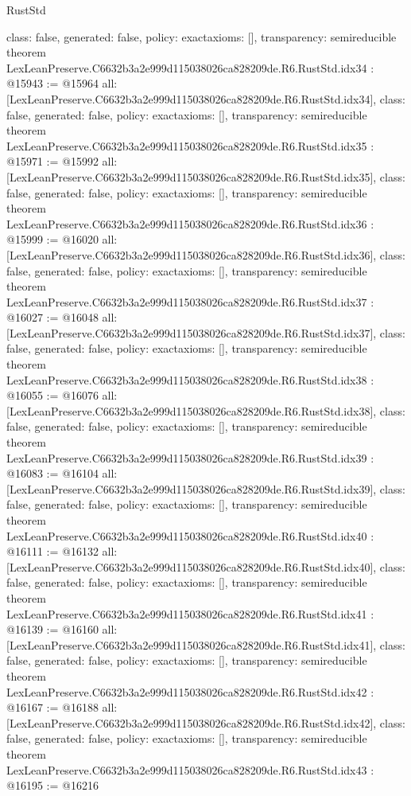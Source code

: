 \begin{lexlean}{RustStd}
\begin{coremodule}
{  class: false,
  generated: false,
  policy: exact{axioms: []},
  transparency: semireducible
}
theorem LexLeanPreserve.C6632b3a2e999d115038026ca828209de.R6.RustStd.idx34 : @15943 := @15964 {
  all: [LexLeanPreserve.C6632b3a2e999d115038026ca828209de.R6.RustStd.idx34],
  class: false,
  generated: false,
  policy: exact{axioms: []},
  transparency: semireducible
}
theorem LexLeanPreserve.C6632b3a2e999d115038026ca828209de.R6.RustStd.idx35 : @15971 := @15992 {
  all: [LexLeanPreserve.C6632b3a2e999d115038026ca828209de.R6.RustStd.idx35],
  class: false,
  generated: false,
  policy: exact{axioms: []},
  transparency: semireducible
}
theorem LexLeanPreserve.C6632b3a2e999d115038026ca828209de.R6.RustStd.idx36 : @15999 := @16020 {
  all: [LexLeanPreserve.C6632b3a2e999d115038026ca828209de.R6.RustStd.idx36],
  class: false,
  generated: false,
  policy: exact{axioms: []},
  transparency: semireducible
}
theorem LexLeanPreserve.C6632b3a2e999d115038026ca828209de.R6.RustStd.idx37 : @16027 := @16048 {
  all: [LexLeanPreserve.C6632b3a2e999d115038026ca828209de.R6.RustStd.idx37],
  class: false,
  generated: false,
  policy: exact{axioms: []},
  transparency: semireducible
}
theorem LexLeanPreserve.C6632b3a2e999d115038026ca828209de.R6.RustStd.idx38 : @16055 := @16076 {
  all: [LexLeanPreserve.C6632b3a2e999d115038026ca828209de.R6.RustStd.idx38],
  class: false,
  generated: false,
  policy: exact{axioms: []},
  transparency: semireducible
}
theorem LexLeanPreserve.C6632b3a2e999d115038026ca828209de.R6.RustStd.idx39 : @16083 := @16104 {
  all: [LexLeanPreserve.C6632b3a2e999d115038026ca828209de.R6.RustStd.idx39],
  class: false,
  generated: false,
  policy: exact{axioms: []},
  transparency: semireducible
}
theorem LexLeanPreserve.C6632b3a2e999d115038026ca828209de.R6.RustStd.idx40 : @16111 := @16132 {
  all: [LexLeanPreserve.C6632b3a2e999d115038026ca828209de.R6.RustStd.idx40],
  class: false,
  generated: false,
  policy: exact{axioms: []},
  transparency: semireducible
}
theorem LexLeanPreserve.C6632b3a2e999d115038026ca828209de.R6.RustStd.idx41 : @16139 := @16160 {
  all: [LexLeanPreserve.C6632b3a2e999d115038026ca828209de.R6.RustStd.idx41],
  class: false,
  generated: false,
  policy: exact{axioms: []},
  transparency: semireducible
}
theorem LexLeanPreserve.C6632b3a2e999d115038026ca828209de.R6.RustStd.idx42 : @16167 := @16188 {
  all: [LexLeanPreserve.C6632b3a2e999d115038026ca828209de.R6.RustStd.idx42],
  class: false,
  generated: false,
  policy: exact{axioms: []},
  transparency: semireducible
}
theorem LexLeanPreserve.C6632b3a2e999d115038026ca828209de.R6.RustStd.idx43 : @16195 := @16216 {
}
\end{coremodule}
\end{lexlean}
